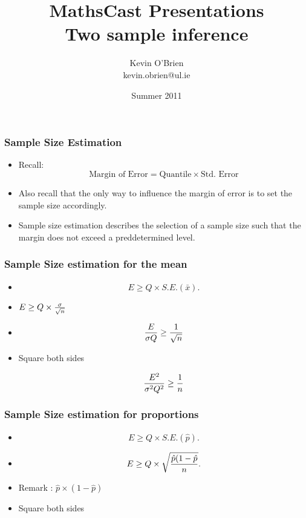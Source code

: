 \documentclass[a4]{beamer}
\title[MathsCast]{MathsCast Presentations \\ {\normalsize Two sample inference}}
\author[Kevin O'Brien]{Kevin O'Brien \\ {\scriptsize kevin.obrien@ul.ie}}
\date{Summer 2011}
\institute[Maths \& Stats]{Dept. of Mathematics \& Statistics, \\ University \textit{of} Limerick}
\begin{document}

\begin{frame}
\frametitle{Sample Size Estimation}

\begin{itemize} \item Recall:
\[  \mbox{Margin of Error}  = \mbox{Quantile} \times \mbox{Std. Error}\]

\item Also recall that the only way to influence the margin of error is to set the sample size accordingly.

\item Sample size estimation describes the selection of a sample size such that the margin does not exceed a preddetermined level.
\end{itemize}
\end{frame}

\begin{frame}
\frametitle{Sample Size estimation for the mean}

\begin{itemize}
\item \[ E \geq Q \times S.E.(\bar{x}). \]

\item 
$E \geq Q \times {\sigma \over \sqrt{n} }$

\item
\[ \frac{E}{\sigma Q} \geq {1 \over \sqrt{n} } \]

\item Square both sides


\[ \frac{E^2}{\sigma^2 Q^2} \geq {1 \over n } \]


\end{itemize}
\end{frame}

\begin{frame}
\frametitle{Sample Size estimation for proportions}

\begin{itemize}
\item \[ E \geq Q \times S.E.(\hat{p}). \]

\item 
\[ E \geq Q \times \sqrt{{\hat{p}(1-\hat{p} \over n}}. \]

\item Remark : $\hat{p} \times (1-\hat{p})$

\item Square both sides



\end{itemize}

\end{frame}
\end{document}
